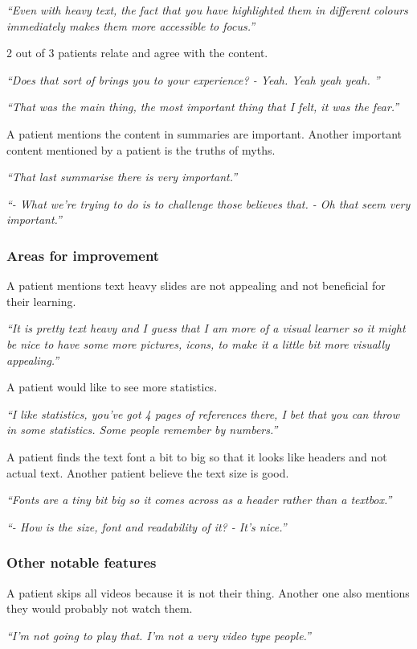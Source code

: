 \documentclass{sigchi}
\begin{document}
\textit{“Even with heavy text, the fact that you have highlighted them in different colours immediately makes them more accessible to focus.”}

2 out of 3 patients relate and agree with the content.

\textit{“Does that sort of brings you to your experience? - Yeah. Yeah yeah yeah. ”}

\textit{“That was the main thing, the most important thing that I felt, it was the fear.”}

A patient mentions the content in summaries are important. Another important content mentioned by a patient is the truths of myths.

\textit{“That last summarise there is very important.”}

\textit{“- What we’re trying to do is to challenge those believes that. - Oh that seem very important.”}

\subsubsection{Areas for improvement}
A patient mentions text heavy slides are not appealing and not beneficial for their learning.

\textit{“It is pretty text heavy and I guess that I am more of a visual learner so it might be nice to have some more pictures, icons,  to make it a little bit more visually appealing.”}

A patient would like to see more statistics. 

\textit{“I like statistics, you’ve got 4 pages of references there, I bet that you can throw in some statistics. Some people remember by numbers.”}

A patient finds the text font a bit to big so that it looks like headers and not actual text. Another patient believe the text size is good.

\textit{“Fonts are a tiny bit big so it comes across as a header rather than a textbox.”}

\textit{“- How is the size, font and readability of it? - It’s nice.”}

\subsubsection{Other notable features}
A patient skips all videos because it is not their thing. Another one also mentions they would probably not watch them.

\textit{“I’m not going to play that. I’m not a very video type people.”}
\end{document}
